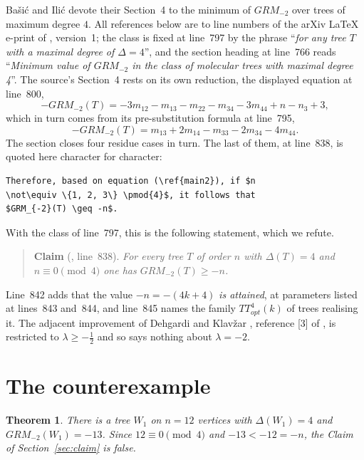 \documentclass[11pt]{amsart}
\newtheorem{theorem}{Theorem}
\begin{document}
Ba\v{s}i\'{c} and Ili\'{c} \cite{BasicIlic} devote their Section~4 to the minimum of
$GRM_{-2}$ over trees of maximum degree $4$. All references below are to line numbers of the
arXiv \LaTeX{} e-print of \cite{BasicIlic}, version~1; the class is fixed at line~797 by the
phrase ``\emph{for any tree $T$ with a maximal degree of $\Delta=4$}'', and the section
heading at line~766 reads ``\emph{Minimum value of $GRM_{-2}$ in the class of molecular trees
with maximal degree 4}''.
The source's Section~4 rests on its own reduction, the displayed equation at line~800,
\begin{equation}\label{eq:main2}
  -GRM_{-2}(T)=-3m_{12}-m_{13}-m_{22}-m_{34}-3m_{44}+n-n_3+3 ,
\end{equation}
which in turn comes from its pre-substitution formula at line~795,
\begin{equation}\label{eq:l795}
  -GRM_{-2}(T)=m_{13}+2m_{14}-m_{33}-2m_{34}-4m_{44}.
\end{equation}
The section closes four residue cases in turn. The last of them, at line~838, is quoted here
character for character:
\begin{verbatim}
Therefore, based on equation (\ref{main2}), if $n
\not\equiv \{1, 2, 3\} \pmod{4}$, it follows that
$GRM_{-2}(T) \geq -n$.
\end{verbatim}
With the class of line~797, this is the following statement, which we refute.

\begin{quote}
\textbf{Claim} (\cite{BasicIlic}, line~838). \emph{For every tree $T$ of order $n$ with
$\Delta(T)=4$ and $n\equiv 0\pmod 4$ one has $GRM_{-2}(T)\ge -n$.}
\end{quote}

Line~842 adds that the value $-n=-(4k+4)$ \emph{is attained}, at parameters listed at
lines~843 and~844, and line~845 names the family $TT^4_{opt}(k)$ of trees realising it.
The adjacent improvement of Dehgardi and Klav\v{z}ar
\cite{DehgardiKlavzar}, reference \textup{[3]} of \cite{BasicIlic}, is restricted to
$\lambda\ge-\tfrac12$ and so says nothing about $\lambda=-2$.

\section{The counterexample}\label{sec:ce}

\begin{theorem}\label{thm:main}
There is a tree $W_1$ on $n=12$ vertices with $\Delta(W_1)=4$ and $GRM_{-2}(W_1)=-13$. Since
$12\equiv 0\pmod 4$ and $-13<-12=-n$, the Claim of Section~\textup{\ref{sec:claim}} is false.
\end{theorem}
\end{document}
